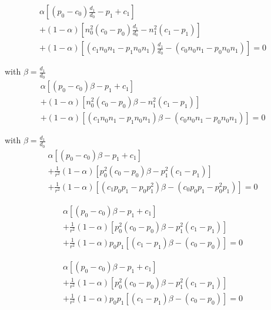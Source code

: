 \documentclass{article}
\begin{document}
\begin{align*}
\alpha\left[\left(p_0 - c_0\right) \frac{d_1}{d_0} -p_1 + c_1\right] \\
+ (1 - \alpha) \left[
	n_0^2 \left(c_0 - p_0\right) \frac{d_1}{d_0} - n_1^2\left(c_1 -  p_1\right)
\right] \\
+ (1 - \alpha) \left[
	\left(c_1 n_0n_1 - p_1n_0 n_1\right)\frac{d_1}{d_0} - \left(c_0n_0n_1 - p_0n_0n_1\right)
\right] = 0
\end{align*}

with $\beta = \frac{d_1}{d_0}$
\begin{align*}
\alpha\left[\left(p_0 - c_0\right) \beta -p_1 + c_1\right] \\
+ (1 - \alpha) \left[
	n_0^2 \left(c_0 - p_0\right) \beta - n_1^2\left(c_1 -  p_1\right)
\right] \\
+ (1 - \alpha) \left[
	\left(c_1 n_0n_1 - p_1n_0 n_1\right)\beta - \left(c_0n_0n_1 - p_0n_0n_1\right)
\right] = 0
\end{align*}




with $\beta = \frac{d_1}{d_0}$
\begin{align*}
\alpha\left[\left(p_0 - c_0\right) \beta -p_1 + c_1\right] \\
+ \frac 1 {r^2}(1 - \alpha) \left[
	 p_0^2 \left(c_0 - p_0\right) \beta -  p_1^2\left(c_1 -  p_1\right)
\right] \\
+ \frac 1 {r^2}(1 - \alpha) \left[
	\left( c_1 p_0 p_1 - p_0 p_1^2\right)\beta - \left(c_0p_0p_1 - p_0^2p_1\right)
\right] = 0
\end{align*}


\begin{align*}
\alpha\left[\left(p_0 - c_0\right) \beta -p_1 + c_1\right] \\
+ \frac 1 {r^2}(1 - \alpha) \left[
	 p_0^2 \left(c_0 - p_0\right) \beta -  p_1^2\left(c_1 -  p_1\right)
\right] \\
+ \frac 1 {r^2}(1 - \alpha) p_0p_1\left[
	\left( c_1 - p_1\right)\beta - \left(c_0 - p_0\right)
\right] = 0
\end{align*}


\begin{align*}
\alpha\left[\left(p_0 - c_0\right) \beta -p_1 + c_1\right] \\
+ \frac 1 {r^2}(1 - \alpha) \left[
	 p_0^2 \left(c_0 - p_0\right) \beta -  p_1^2\left(c_1 -  p_1\right)
\right] \\
+ \frac 1 {r^2}(1 - \alpha) p_0p_1\left[
	\left( c_1 - p_1\right)\beta - \left(c_0 - p_0\right)
\right] = 0
\end{align*}
\end{document}
